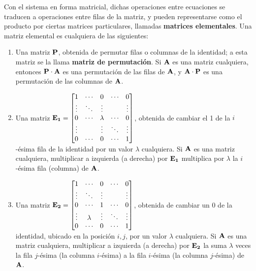 Con el sistema en forma matricial, dichas operaciones entre ecuaciones se
traducen a operaciones entre filas de la matriz, y pueden representarse como
el producto por ciertas matrices particulares, llamadas \textbf{matrices
elementales}. Una matriz elemental es cualquiera de las siguientes:
\begin{enumerate}[label=(\arabic*)]
\item Una matriz $\mathbf{P}$, obtenida de permutar filas o columnas de la
    identidad; a esta matriz se la llama \textbf{matriz de permutación}.
    Si $\mathbf{A}$ es una matriz cualquiera, entonces $\mathbf{P}\cdot\mathbf{A}$ es
    una permutación de las filas de $\mathbf{A}$, y $\mathbf{A}\cdot\mathbf{P}$ es una
    permutación de las columnas de $\mathbf{A}$.
\item Una matriz $\mathbf{E_1} = \begin{bmatrix}
    1      & \cdots & 0       & \cdots & 0      \\
    \vdots & \ddots & \vdots  &        & \vdots \\
    0      & \cdots & \lambda & \cdots & 0      \\
    \vdots &        & \vdots  & \ddots & \vdots \\
    0      & \cdots & 0       & \cdots & 1      \\
\end{bmatrix}$, obtenida de cambiar el 1 de la $i$-ésima fila de la
identidad por un valor $\lambda$ cualquiera. Si $\mathbf{A}$ es una matriz
cualquiera, multiplicar a izquierda (a derecha) por $\mathbf{E_1}$ multiplica por
$\lambda$ la $i$-ésima fila (columna) de $\mathbf{A}$.
\item Una matriz $\mathbf{E_2} = \begin{bmatrix}
    1      & \cdots  & 0      & \cdots & 0      \\
    \vdots & \ddots  & \vdots &        & \vdots \\
    0      & \cdots  & 1      & \cdots & 0      \\
    \vdots & \lambda & \vdots & \ddots & \vdots \\
    0      & \cdots  & 0      & \cdots & 1      \\
\end{bmatrix}$, obtenida de cambiar un 0 de la identidad, ubicado
en la posición $i,j$, por un valor $\lambda$ cualquiera. Si $\mathbf{A}$ es una
matriz cualquiera, multiplicar a izquierda (a derecha) por $\mathbf{E_2}$
la suma $\lambda$ veces la fila $j$-ésima (la columna $i$-ésima) a la
fila $i$-ésima (la columna $j$-ésima) de $\mathbf{A}$.
\end{enumerate}

